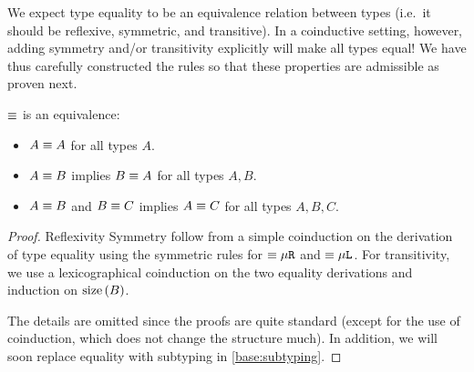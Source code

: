 
We expect type equality to be an equivalence relation between types (i.e.\ it should be reflexive, symmetric, and transitive). In a coinductive setting, however, adding symmetry and/or transitivity explicitly will make all types equal! We have thus carefully constructed the rules so that these properties are admissible as proven next.


\begin{theorem}
  \label{eq-is-equivalence}
  $\equiv$ is an equivalence:
  \begin{itemize}
    \item $A \equiv A$ for all types $A$.
    \item $A \equiv B$ implies $B \equiv A$ for all types $A, B$.
    \item $A \equiv B$ and $B \equiv C$ implies $A \equiv C$ for all types $A, B, C$.
  \end{itemize}
\end{theorem}

\begin{proof}
  Reflexivity  Symmetry follow from a simple coinduction on the derivation of type equality using the symmetric rules for $\equiv{\mu\texttt{R}}$ and $\equiv{\mu\texttt{L}}$. For transitivity, we use a lexicographical coinduction on the two equality derivations and induction on $\operatorname{size}{(B)}$.

The details are omitted since the proofs are quite standard (except for the use of coinduction, which does not change the structure much). In addition, we will soon replace equality with subtyping in \cref{base:subtyping}.
\end{proof}


